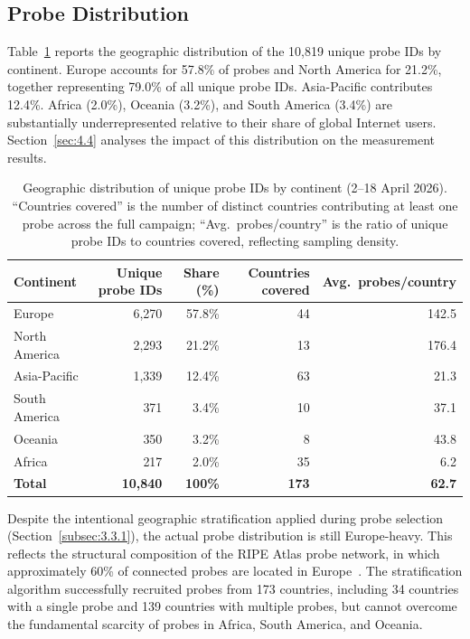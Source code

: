 \subsection{Probe Distribution}
\label{subsec:4.1.2}

Table~\ref{tab:4.2} reports the geographic distribution of the 10,819 unique probe IDs by continent. Europe accounts for 57.8\% of probes and North America for 21.2\%, together representing 79.0\% of all unique probe IDs. Asia-Pacific contributes 12.4\%. Africa (2.0\%), Oceania (3.2\%), and South America (3.4\%) are substantially underrepresented relative to their share of global Internet users. Section~\ref{sec:4.4} analyses the impact of this distribution on the measurement results.

\begin{table}[H]
\centering
\small
\caption{Geographic distribution of unique probe IDs by continent (2--18 April 2026). ``Countries covered'' is the number of distinct countries contributing at least one probe across the full campaign; ``Avg.\ probes/country'' is the ratio of unique probe IDs to countries covered, reflecting sampling density.}
\label{tab:4.2}
\begin{tabular}{l r r r r}
\toprule
\textbf{Continent} & \textbf{Unique probe IDs} & \textbf{Share (\%)} & \textbf{Countries covered} & \textbf{Avg.\ probes/country} \\
\midrule
Europe          & 6,270 & 57.8\% & 44  & 142.5 \\
North America   & 2,293 & 21.2\% & 13  & 176.4 \\
Asia-Pacific    & 1,339 & 12.4\% & 63  &  21.3 \\
South America   &   371 &  3.4\% & 10  &  37.1 \\
Oceania         &   350 &  3.2\% &  8  &  43.8 \\
Africa          &   217 &  2.0\% & 35  &   6.2 \\
\textbf{Total}  & \textbf{10,840} & \textbf{100\%} & \textbf{173} & \textbf{62.7} \\
\bottomrule
\end{tabular}
\end{table}

Despite the intentional geographic stratification applied during probe selection (Section~\ref{subsec:3.3.1}), the actual probe distribution is still Europe-heavy. This reflects the structural composition of the RIPE Atlas probe network, in which approximately 60\% of connected probes are located in Europe~\cite{Bajpai2017}. The stratification algorithm successfully recruited probes from 173 countries, including 34 countries with a single probe and 139 countries with multiple probes, but cannot overcome the fundamental scarcity of probes in Africa, South America, and Oceania.

